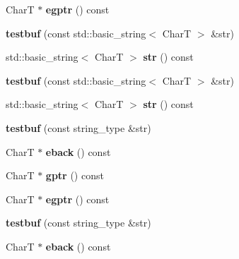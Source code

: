 \begin{DoxyCompactItemize}
\item 
\mbox{\label{structtestbuf_a3aaa639283f34387537715800c38e416}} 
CharT $\ast$ {\bfseries egptr} () const
\item 
\mbox{\label{structtestbuf_aade97a7fab3e46f2b3d604917be590a8}} 
{\bfseries testbuf} (const std\+::basic\+\_\+string$<$ CharT $>$ \&str)
\item 
\mbox{\label{structtestbuf_a077afc7549a2a7a21f840ba884695eab}} 
std\+::basic\+\_\+string$<$ CharT $>$ {\bfseries str} () const
\item 
\mbox{\label{structtestbuf_aade97a7fab3e46f2b3d604917be590a8}} 
{\bfseries testbuf} (const std\+::basic\+\_\+string$<$ CharT $>$ \&str)
\item 
\mbox{\label{structtestbuf_a077afc7549a2a7a21f840ba884695eab}} 
std\+::basic\+\_\+string$<$ CharT $>$ {\bfseries str} () const
\item 
\mbox{\label{structtestbuf_af4500052e14c24781929e2e23a03b7f4}} 
{\bfseries testbuf} (const string\+\_\+type \&str)
\item 
\mbox{\label{structtestbuf_a1f4df16dc86bc40a9af64b5fff87cef0}} 
CharT $\ast$ {\bfseries eback} () const
\item 
\mbox{\label{structtestbuf_a30875f59e62daf2cf38ec0cd7e79ee68}} 
CharT $\ast$ {\bfseries gptr} () const
\item 
\mbox{\label{structtestbuf_a3aaa639283f34387537715800c38e416}} 
CharT $\ast$ {\bfseries egptr} () const
\item 
\mbox{\label{structtestbuf_af4500052e14c24781929e2e23a03b7f4}} 
{\bfseries testbuf} (const string\+\_\+type \&str)
\item 
\mbox{\label{structtestbuf_a1f4df16dc86bc40a9af64b5fff87cef0}} 
CharT $\ast$ {\bfseries eback} () const
\item 
\mbox{\label{structtestbuf_a30875f59e62daf2cf38ec0cd7e79ee68}} 

\end{DoxyCompactItemize}
